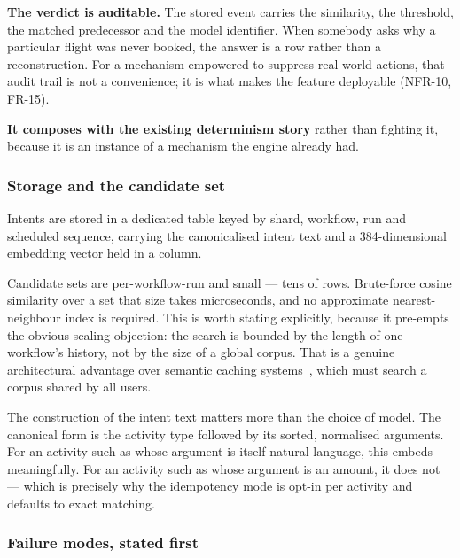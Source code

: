 \textbf{The verdict is auditable.} The stored event carries the similarity,
the threshold, the matched predecessor and the model identifier. When somebody
asks why a particular flight was never booked, the answer is a row rather than
a reconstruction. For a mechanism empowered to suppress real-world actions,
that audit trail is not a convenience; it is what makes the feature deployable
(NFR-10, FR-15).

\textbf{It composes with the existing determinism story} rather than fighting
it, because it is an instance of a mechanism the engine already had.

\subsubsection{Storage and the candidate set}

Intents are stored in a dedicated table keyed by shard, workflow, run and
scheduled sequence, carrying the canonicalised intent text and a
384-dimensional embedding vector held in a  column.

Candidate sets are per-workflow-run and small --- tens of rows. Brute-force
cosine similarity over a set that size takes microseconds, and no approximate
nearest-neighbour index is required. This is worth stating explicitly, because
it pre-empts the obvious scaling objection: the search is bounded by the
length of one workflow's history, not by the size of a global corpus. That is
a genuine architectural advantage over semantic caching
systems~\cite{gptcache2023}, which must search a corpus shared by all users.

The construction of the intent text matters more than the choice of model. The
canonical form is the activity type followed by its sorted, normalised
arguments. For an activity such as  whose argument is
itself natural language, this embeds meaningfully. For an activity such as
 whose argument is an amount, it does not --- which is
precisely why the idempotency mode is opt-in per activity and defaults to
exact matching.

\subsubsection{Failure modes, stated first}

